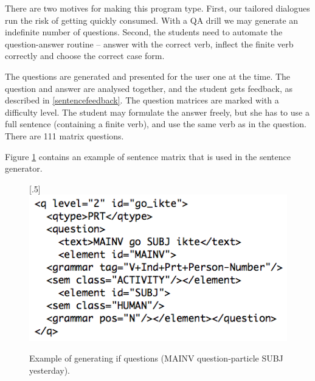 \documentclass[11pt]{article}
\begin{document}
There are two motives for making this program type. First, our tailored dialogues run the risk of getting quickly consumed. With a QA drill we may generate an indefinite number of questions. Second, the students need to automate the question-answer routine -- answer with the correct verb, inflect the finite verb correctly and choose the correct case form.

The questions are generated and presented for the user one at the time. The question and answer are analysed together, and the student gets feedback, as described in \ref{sentencefeedback}. The question matrices are marked with a difficulty level.  The student may formulate the answer freely, but she has to use a full sentence (containing a finite verb), and use the same verb as in the question. There are 111 matrix questions.

Figure \ref{questionv} contains an example of sentence matrix that is used in the sentence generator.

\begin{figure}[htbp]
\begin{center}
\scalebox{.5}[.5]{\includegraphics{presentation/img/question_vasta2.png}}\\
\caption{Example of generating if questions (MAINV question-particle SUBJ yesterday).}
\label{questionv}
\end{center}
\end{figure}

%
\end{document}
